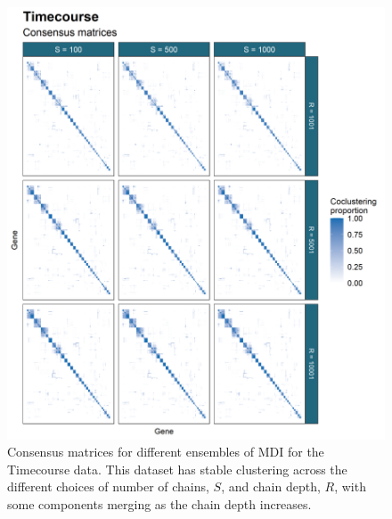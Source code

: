 \documentclass[]{article}
\begin{document}
\begin{figure}
	\centering
	\includegraphics[scale=0.8]{../Images/Yeast/TimecourseCMcomparison.png}
	\caption{Consensus matrices for different ensembles of MDI for the Timecourse data. This dataset has stable clustering across the different choices of number of chains, $S$, and chain depth, $R$, with some components merging as the chain depth increases.}
	\label{fig:timecourseCMs}
\end{figure}
\end{document}
